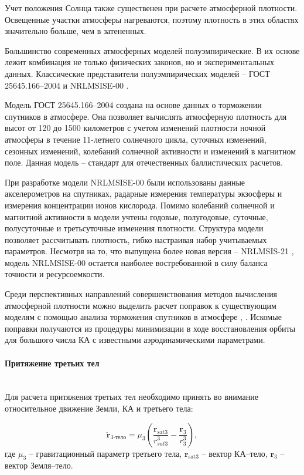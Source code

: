 Учет положения Солнца также существенен при расчете атмосферной плотности.
Освещенные участки атмосферы нагреваются, поэтому плотность в этих областях значительно
больше, чем в затененных.

Большинство современных атмосферных моделей полуэмпирические. 
В их основе лежит комбинация не только
физических законов, но и экспериментальных данных. 
Классические представители полуэмпирических моделей 
-- ГОСТ 25645.166--2004 \cite{gost1662004} и NRLMSISE-00 \cite{picone2002}.

Модель ГОСТ 25645.166--2004 создана на основе данных о торможении спутников в атмосфере.
Она позволяет вычислять атмосферную плотность для высот от 120 до 1500 километров с учетом
изменений плотности ночной атмосферы в течение 11-летнего солнечного цикла, суточных изменений,
сезонных изменений, колебаний солнечной активности и изменений в магнитном поле.
Данная модель -- стандарт для отечественных баллистических расчетов.

При разработке модели NRLMSISE-00 были использованы данные акселерометров на спутниках,
радарные измерения температуры экзосферы и измерения концентрации ионов кислорода.
Помимо колебаний солнечной и магнитной активности в модели
учтены годовые, полугодовые, суточные, полусуточные и третьсуточные изменения плотности.
Структура модели позволяет рассчитывать плотность, гибко настраивая набор учитываемых параметров.
Несмотря на то, что выпущена более новая версия -- NRLMSIS-21 \cite{emmert2021, emmert2022}, 
модель NRLMSISE-00 остается наиболее востребованной в силу баланса точности и ресурсоемкости.

Среди перспективных направлений совершенствования методов вычисления атмосферной плотности 
можно выделить расчет поправок к существующим моделям с помощью анализа торможения спутников
в атмосфере \cite{cefola2003}, \cite{tulin2018}. Искомые поправки получаются из процедуры минимизации в ходе
восстановления орбиты для большого числа КА с известными
аэродинамическими параметрами.

\paragraph{Притяжение третьих тел} \mbox{} \\

Для расчета притяжения третьих тел необходимо принять во внимание относительное движение
Земли, КА и третьего тела:

\begin{equation*}
    \ddot{\mathbf{r}}_{\text{3-тело}} = \mu_3 \left( \frac{\mathbf{r}_{\text{sat3}}}{r^3_{sat3}}
                                    - \frac{\mathbf{r}_{\text{3}}}{r^3_{3}} \right),
\end{equation*}
где $\mu_3$ -- гравитационный параметр третьего тела,
 $\mathbf{r}_{\text{sat3}}$ -- вектор КА--тело, 
 $\mathbf{r}_{3}$ -- вектор Земля--тело. 

